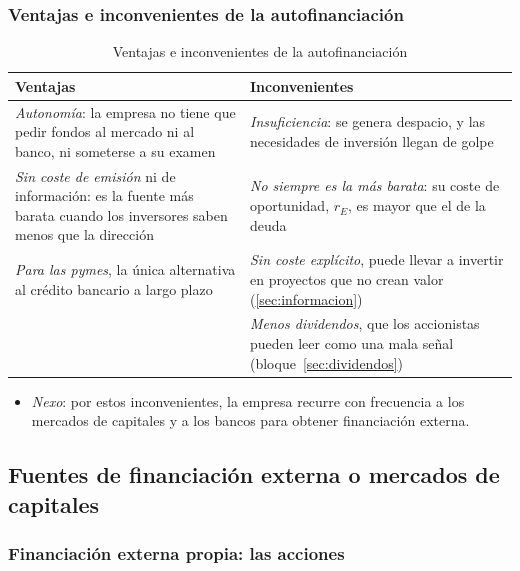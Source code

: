 \documentclass[11pt]{article}
\begin{document}
\subsubsection{Ventajas e inconvenientes de la autofinanciación}\label{sec:ventajas-autofinanciacion}

\begin{table}[H]
\centering
\caption{Ventajas e inconvenientes de la autofinanciación}\label{tab:autofinanciacion}
\begin{tabular}{>{\raggedright\arraybackslash}m{7cm}>{\raggedright\arraybackslash}m{7cm}}
\toprule
\rowcolor{tceeazulpalido}\textbf{Ventajas} & \textbf{Inconvenientes} \\
\midrule
\emph{Autonomía}: la empresa no tiene que pedir fondos al mercado ni al banco, ni someterse a su examen & \emph{Insuficiencia}: se genera despacio, y las necesidades de inversión llegan de golpe \\
\emph{Sin coste de emisión} ni de información: es la fuente más barata cuando los inversores saben menos que la dirección & \emph{No siempre es la más barata}: su coste de oportunidad, $r_E$, es mayor que el de la deuda \\
\emph{Para las pymes}, la única alternativa al crédito bancario a largo plazo & \emph{Sin coste explícito}, puede llevar a invertir en proyectos que no crean valor (\ref{sec:informacion}) \\
& \emph{Menos dividendos}, que los accionistas pueden leer como una mala señal (bloque~\ref{sec:dividendos}) \\
\bottomrule
\end{tabular}
\end{table}

\begin{itemize}
\item \emph{Nexo}: por estos inconvenientes, la empresa recurre con frecuencia a los mercados de capitales y a los bancos para obtener financiación externa.
\end{itemize}

\subsection{Fuentes de financiación externa o mercados de capitales}\label{sec:externa}

\subsubsection{Financiación externa propia: las acciones}\label{sec:acciones}
\end{document}
